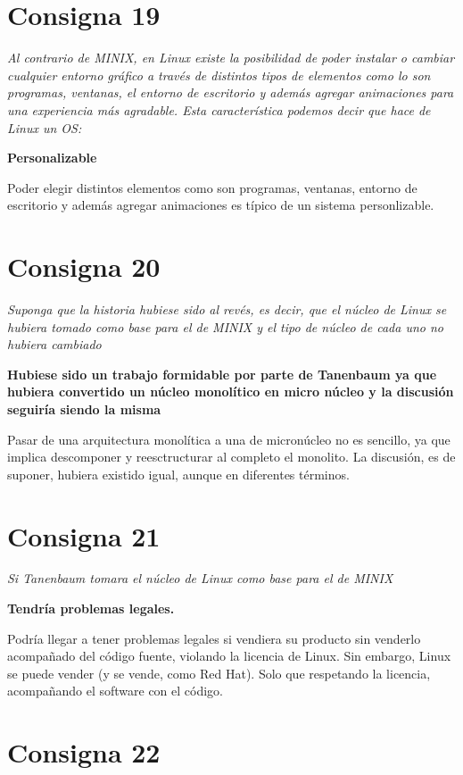 \documentclass[11pt]{article}
\begin{document}
\section*{Consigna 19}

\emph{Al contrario de MINIX, en Linux existe la posibilidad de poder instalar o
cambiar cualquier entorno gráfico a través de distintos tipos de elementos como
lo son programas, ventanas, el entorno de escritorio y además agregar
animaciones para una experiencia más agradable. Esta característica podemos
decir que hace de Linux un OS:}

\textbf{
    Personalizable
}

Poder elegir distintos elementos como son programas, ventanas, entorno de 
escritorio y además agregar animaciones es típico de un sistema personlizable.

\section*{Consigna 20}

\emph{
    Suponga que la historia hubiese sido al revés, es decir, que el núcleo de Linux se
hubiera tomado como base para el de MINIX y el tipo de núcleo de cada uno no hubiera
cambiado
}

\textbf{
    Hubiese sido un trabajo formidable por parte de Tanenbaum ya que hubiera
convertido un núcleo monolítico en micro núcleo y la discusión seguiría siendo la
misma
}

Pasar de una arquitectura monolítica a una de micronúcleo no es sencillo, ya 
que implica descomponer y reesctructurar al completo el monolito. La discusión,
es de suponer, hubiera existido igual, aunque en diferentes términos.

\section*{Consigna 21}

\emph{
    Si Tanenbaum tomara el núcleo de Linux como base para el de MINIX
}

\textbf{
    Tendría problemas legales.
}

Podría llegar a tener problemas legales si vendiera su producto sin venderlo 
acompañado del código fuente, violando la licencia de Linux. Sin embargo, Linux 
se puede vender (y se vende, como Red Hat). Solo que respetando la licencia,
acompañando el software con el código.

\section*{Consigna 22}
\end{document}
